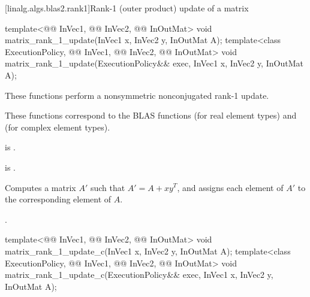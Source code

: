 [linalg.algs.blas2.rank1]{Rank-1 (outer product) update of a matrix}

\begin{itemdecl}
template<@@ InVec1, @@ InVec2, @@ InOutMat>
  void matrix_rank_1_update(InVec1 x, InVec2 y, InOutMat A);
template<class ExecutionPolicy, @@ InVec1, @@ InVec2, @@ InOutMat>
  void matrix_rank_1_update(ExecutionPolicy&& exec, InVec1 x, InVec2 y, InOutMat A);
\end{itemdecl}

\begin{itemdescr}
\pnum
These functions perform a nonsymmetric nonconjugated rank-1 update.
\begin{note}
These functions correspond to the BLAS functions
 (for real element types) and
 (for complex element types).
\end{note}

\pnum
\mandates
{}
is .

\pnum
\expects
{} is .

\pnum
\effects
Computes a matrix $A'$ such that $A' = A + x y^T$,
and assigns each element of $A'$ to the corresponding element of $A$.

\pnum
\complexity
{}.
\end{itemdescr}

\begin{itemdecl}
template<@@ InVec1, @@ InVec2, @@ InOutMat>
  void matrix_rank_1_update_c(InVec1 x, InVec2 y, InOutMat A);
template<class ExecutionPolicy, @@ InVec1, @@ InVec2, @@ InOutMat>
  void matrix_rank_1_update_c(ExecutionPolicy&& exec, InVec1 x, InVec2 y, InOutMat A);
\end{itemdecl}

